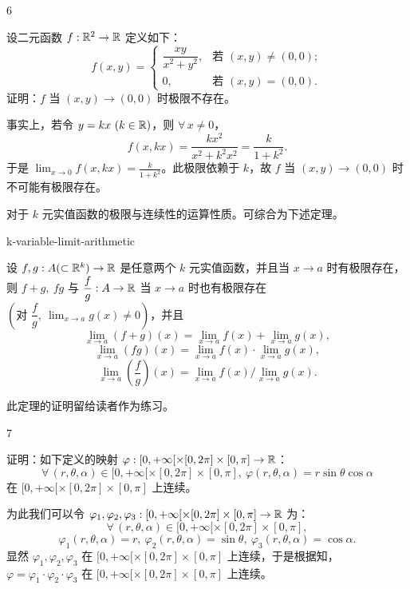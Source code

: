 \begin{sourceexample}{6}

设二元函数 $f:\mathbb{R}^2\to\mathbb{R}$ 定义如下：
\[f(x,y)=\begin{cases} \dfrac{xy}{x^2+y^2}, & \text{若 }(x,y)\neq(0,0);\\[1ex] 0, & \text{若 }(x,y)=(0,0). \end{cases}\]
证明：$f$ 当 $(x,y)\to(0,0)$ 时极限不存在。

事实上，若令 $y=kx\ (k\in\mathbb{R})$，则 $\forall\,x\neq0$，
\[f(x,kx)=\frac{kx^2}{x^2+k^2x^2}=\frac{k}{1+k^2}.\]
于是 $\displaystyle\lim_{x\to0}f(x,kx)=\frac{k}{1+k^2}$。此极限依赖于 $k$，故 $f$ 当 $(x,y)\to(0,0)$ 时不可能有极限存在。

\end{sourceexample}

对于 $k$ 元实值函数的极限与连续性的运算性质。可综合为下述定理。

\begin{mythm}{}{k-variable-limit-arithmetic}

设 $f,g:A(\subset\mathbb{R}^k)\to\mathbb{R}$ 是任意两个 $k$ 元实值函数，并且当 $x\to a$ 时有极限存在，则 $f+g,\ fg$ 与 $\dfrac{f}{g}:A\to\mathbb{R}$ 当 $x\to a$ 时也有极限存在 $\left(\text{对 }\dfrac{f}{g},\ \displaystyle\lim_{x\to a}g(x)\neq0\right)$，并且
\[\lim_{x\to a}(f+g)(x)=\lim_{x\to a}f(x)+\lim_{x\to a}g(x),\]
\[\lim_{x\to a}(fg)(x)=\lim_{x\to a}f(x)\cdot\lim_{x\to a}g(x),\]
\[\lim_{x\to a}\left(\frac{f}{g}\right)(x)=\lim_{x\to a}f(x)\Big/\lim_{x\to a}g(x).\]

\end{mythm}

此定理的证明留给读者作为练习。

\begin{sourceexample}{7}

证明：如下定义的映射 $\varphi:[0,+\infty[\times[0,2\pi]\times[0,\pi]\to\mathbb{R}$：
\[\forall\,(r,\theta,\alpha)\in[0,+\infty[\times[0,2\pi]\times[0,\pi],\ \varphi(r,\theta,\alpha)=r\sin\theta\cos\alpha\]
在 $[0,+\infty[\times[0,2\pi]\times[0,\pi]$ 上连续。

为此我们可以令 $\varphi_1,\varphi_2,\varphi_3:[0,+\infty[\times[0,2\pi]\times[0,\pi]\to\mathbb{R}$ 为：
\[\forall\,(r,\theta,\alpha)\in[0,+\infty[\times[0,2\pi]\times[0,\pi],\]
\[\varphi_1(r,\theta,\alpha)=r,\ \varphi_2(r,\theta,\alpha)=\sin\theta,\ \varphi_3(r,\theta,\alpha)=\cos\alpha.\]
显然 $\varphi_1,\varphi_2,\varphi_3$ 在 $[0,+\infty[\times[0,2\pi]\times[0,\pi]$ 上连续，于是根据知，$\varphi=\varphi_1\cdot\varphi_2\cdot\varphi_3$ 在 $[0,+\infty[\times[0,2\pi]\times[0,\pi]$ 上连续。

\end{sourceexample}

